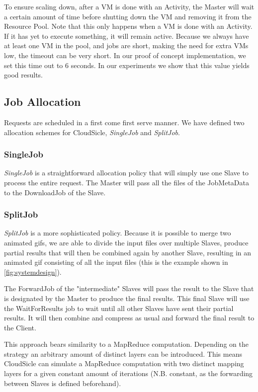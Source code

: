 \documentclass[twocolumn,twoside]{IEEEtran}
\begin{document}
To ensure scaling down, after a VM is done with an Activity, the Master will wait a certain amount of time before shutting down the VM and removing it from the Resource Pool. Note that this only happens when a VM is done with an Activity. If it has yet to execute something, it will remain active. Because we always have at least one VM in the pool, and jobs are short, making the need for extra VMs low, the timeout can be very short. In  our proof of concept implementation, we set this time out to 6 seconds. In our experiments we show that this value yields good results.

\subsection{Job Allocation}
Requests are scheduled in a first come first serve manner. We have defined two allocation schemes for CloudSicle, \emph{SingleJob} and \emph{SplitJob}.
\subsubsection{SingleJob} 
\emph{SingleJob} is a straightforward allocation policy that will simply use one Slave to process the entire request. The Master will pass all the files of the JobMetaData to the DownloadJob of the Slave.
\subsubsection{SplitJob}
\emph{SplitJob} is a more sophisticated policy. Because it is possible to merge two animated gifs, we are able to divide the input files over multiple Slaves, produce partial results that will then be combined again by another Slave, resulting in an animated gif consisting of all the input files (this is the example shown in \autoref{fig:systemdesign}). 

The ForwardJob of the "intermediate" Slaves will pass the result to the Slave that is designated by the Master to produce the final results. This final Slave will use the WaitForResults job to wait until all other Slaves have sent their partial results. It will then combine and compress as usual and forward the final result to the Client.

This approach bears similarity to a MapReduce computation.
Depending on the strategy an arbitrary amount of distinct
layers can be introduced. This means CloudSicle can simulate
a MapReduce computation with two distinct mapping layers for
a given constant amount of iterations (N.B. constant, as the forwarding between
Slaves is defined beforehand).
\end{document}
